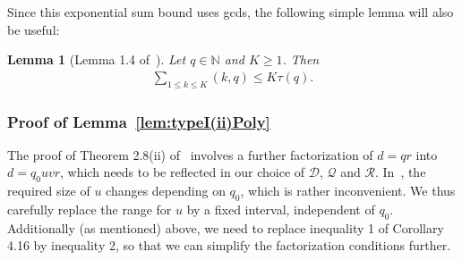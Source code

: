 \documentclass{amsart}
\newtheorem{lemma}{Lemma}
\numberwithin{equation}{section}
\begin{document}
Since this exponential sum bound uses gcds, the following simple lemma will also be useful: 
\begin{lemma}[Lemma 1.4 of~\cite{Polymath:2014:EDZ}] Let $q \in \mathbb{N}$ and $K \geq 1$. Then 
\begin{align*}
\sum_{1 \leq k \leq K} (k,q) \leq K \tau(q).
\end{align*}
\end{lemma}


 

\subsubsection{Proof of Lemma~\ref{lem:typeI(ii)Poly}} The proof of Theorem 2.8(ii) of~\cite{Polymath:2014:EDZ} involves a further factorization of $d=qr$ into $d=q_0uvr$, which needs to be reflected in our choice of $\mathcal{D}$, $\mathcal{Q}$ and $\mathcal{R}$. In~\cite{Polymath:2014:EDZ}, the required size of $u$ changes depending on $q_0$, which is rather inconvenient. We thus carefully replace the  range for $u$ by a fixed interval, independent of $q_0$. Additionally (as mentioned) above, we need to replace inequality 1 of Corollary 4.16 by inequality 2, so that we can simplify the factorization conditions further.
\end{document}
